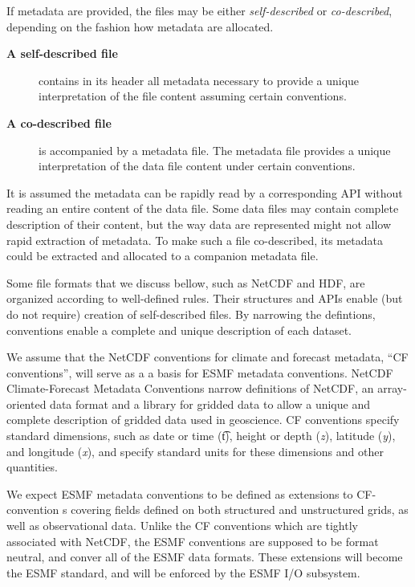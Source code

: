 If metadata are provided, the files may be either {\em self-described} or
{\em co-described}, depending on the fashion how metadata are allocated.
\begin{description}
\item[\bf A self-described file] contains in its header all metadata 
necessary to provide a unique interpretation of the file content
assuming certain conventions.  
\item[\bf A co-described file] is accompanied by a metadata file. The
metadata file provides a unique interpretation of the data file content
under certain conventions. 
\end{description}
It is assumed the metadata can be rapidly read by a corresponding API without 
reading an entire content of the data file. Some data files may contain 
complete description of their content, but the way data are represented might 
not allow rapid extraction of metadata. To make such a file co-described, its 
metadata could be extracted and allocated to a companion metadata file.

Some file formats that we discuss bellow, such as NetCDF and HDF, are 
organized according to well-defined rules. Their structures and APIs enable 
(but do not require) creation of self-described files. By narrowing 
the defintions, conventions enable a complete and unique description of each 
dataset.

We assume that the NetCDF conventions for climate and forecast metadata, 
``CF conventions'', will serve as a a basis for ESMF metadata conventions.
 NetCDF Climate-Forecast Metadata Conventions
\cite{NetCDF_CF_v1_beta3} narrow definitions of NetCDF, an
array-oriented data format and a library for gridded data 
\cite{NetCDF3_UsersGuide_C} to allow a unique and complete description
of gridded data used in geoscience. CF conventions specify standard 
dimensions, such as date or time ({\t t}), height or depth ({\it z}), 
latitude ({\it y}), and longitude ({\it x}), and specify standard
units for these dimensions and other quantities. 


We expect ESMF metadata conventions to be defined as extensions to
CF-convention s covering fields defined on both structured and
unstructured grids, as well as observational data. Unlike the CF
conventions which are tightly associated with NetCDF, the ESMF
conventions are supposed to be format neutral, and conver all of the
ESMF data formats.  These extensions will become the ESMF standard,
and will be enforced by the ESMF I/O subsystem.

